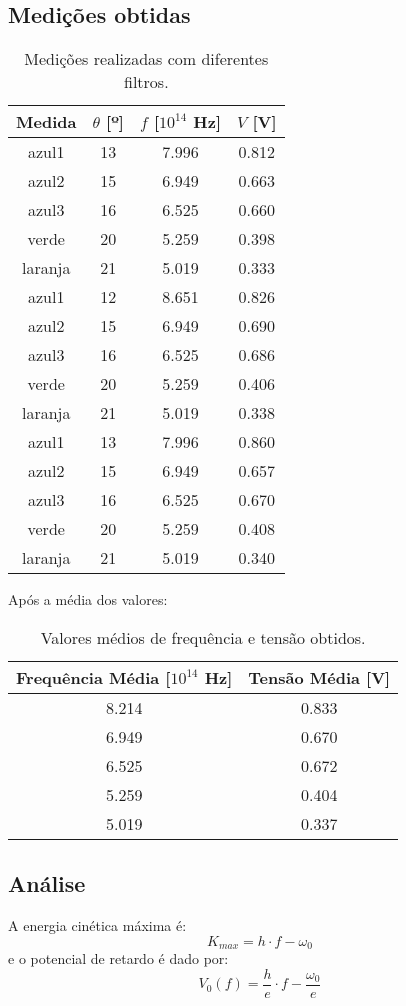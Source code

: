 \documentclass[conference]{IEEEtran}
\begin{document}
\subsection{Medições obtidas}
\begin{table}[H]
\centering
\begin{tabular}{cccc}
\toprule
Medida & $\theta$ [º] & $f$ [$10^{14}$ Hz] & $V$ [V] \\
\midrule
azul1 & 13 & 7.996 & 0.812 \\
azul2 & 15 & 6.949 & 0.663 \\
azul3 & 16 & 6.525 & 0.660 \\
verde & 20 & 5.259 & 0.398 \\
laranja & 21 & 5.019 & 0.333 \\
azul1 & 12 & 8.651 & 0.826 \\
azul2 & 15 & 6.949 & 0.690 \\
azul3 & 16 & 6.525 & 0.686 \\
verde & 20 & 5.259 & 0.406 \\
laranja & 21 & 5.019 & 0.338 \\
azul1 & 13 & 7.996 & 0.860 \\
azul2 & 15 & 6.949 & 0.657 \\
azul3 & 16 & 6.525 & 0.670 \\
verde & 20 & 5.259 & 0.408 \\
laranja & 21 & 5.019 & 0.340 \\
\bottomrule
\end{tabular}
\caption{Medições realizadas com diferentes filtros.}
\end{table}

Após a média dos valores:
\begin{table}[H]
\centering
\begin{tabular}{cc}
\toprule
Frequência Média [$10^{14}$ Hz] & Tensão Média [V] \\
\midrule
8.214 & 0.833 \\
6.949 & 0.670 \\
6.525 & 0.672 \\
5.259 & 0.404 \\
5.019 & 0.337 \\
\bottomrule
\end{tabular}
\caption{Valores médios de frequência e tensão obtidos.}
\end{table}

\subsection{Análise}
A energia cinética máxima é:
\begin{equation}
K_{max} = h \cdot f - \omega_0
\end{equation}
e o potencial de retardo é dado por:
\begin{equation}
V_0(f) = \frac{h}{e} \cdot f - \frac{\omega_0}{e}
\end{equation}
\end{document}
